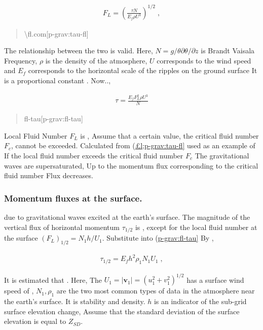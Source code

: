 \begin{eqnarray}
   F_L = \left(
            \frac{\tau N}{E_f \rho U^3}
           \right)^{1/2} \; ,
\end{eqnarray}

\begin{quote}
\protect\hypertarget{p-grav:tau-fl}{}{\textbackslash fl.com{[}p-grav:tau-fl{]}}
\end{quote}

The relationship between the two is valid. Here,
\(N = g/\theta \partial \theta/\partial z\) is Brandt Vaisala Frequency,
\(\rho\) is the density of the atmosphere, \(U\) corresponds to the wind
speed and \(E_f\) corresponds to the horizontal scale of the ripples on
the ground surface It is a proportional constant . Now..,

\begin{eqnarray}
  \tau = \frac{E_f F_L^2 \rho U^3}{N}
\end{eqnarray}

\begin{quote}
\protect\hypertarget{p-grav:fl-tau}{}{fl-tau{[}p-grav:fl-tau{]}}
\end{quote}

Local Fluid Number \(F_L\) is , Assume that a certain value, the
critical fluid number \(F_{c}\), cannot be exceeded. Calculated from
(\protect\hyperlink{p-grav:tau-fl}{£l;p-grav:tau-fl{]}} used as an
example of If the local fluid number exceeds the critical fluid number
\(F_{c}\) The gravitational waves are supersaturated, Up to the momentum
flux corresponding to the critical fluid number Flux decreases.

\hypertarget{momentum-fluxes-at-the-surface.}{%
\subsubsection{Momentum fluxes at the
surface.}\label{momentum-fluxes-at-the-surface.}}

due to gravitational waves excited at the earth's surface. The magnitude
of the vertical flux of horizontal momentum \(\tau_{1/2}\) is , except
for the local fluid number at the surface \((F_L)_{1/2} = N_1 h/U_1\).
Substitute into (\protect\hyperlink{p-grav:fl-tau}{p-grav:fl-tau{]}} By
,

\begin{eqnarray}
  \tau_{1/2} = E_f h^2 \rho_1 N_1 U_1 \; ,
\end{eqnarray}

It is estimated that . Here, The
\(U_1 = |{\mathbf v}_1| = (u_1^2 + v_1^2)^{1/2}\) has a surface wind
speed of , \(N_1, \rho_1\) are the two most common types of data in the
atmosphere near the earth's surface. It is stability and density. \(h\)
is an indicator of the sub-grid surface elevation change, Assume that
the standard deviation of the surface elevation is equal to \(Z_{SD}\).

